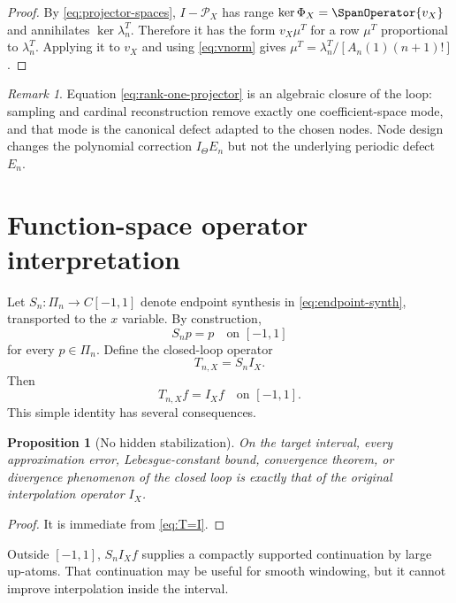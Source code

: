 \documentclass[11pt,oneside]{article}
\newtheorem{proposition}[theorem]{Proposition}
\theoremstyle{definition}
\theoremstyle{remark}
\newtheorem{remark}[theorem]{Remark}
\newcommand{\1}{\mathbf{1}}
\begin{document}
\begin{proof}
By \eqref{eq:projector-spaces}, $I-\mathcal P_X$ has range
$\ker\Phi_X=\SpanOperator\{v_X\}$ and annihilates $\ker\lambda_n^T$.  Therefore it
has the form $v_X\mu^T$ for a row $\mu^T$ proportional to $\lambda_n^T$.
Applying it to $v_X$ and using \eqref{eq:vnorm} gives
$\mu^T=\lambda_n^T/[A_n(1)(n+1)!]$.
\end{proof}

\begin{remark}
Equation \eqref{eq:rank-one-projector} is an algebraic closure of the loop:
sampling and cardinal reconstruction remove exactly one coefficient-space
mode, and that mode is the canonical defect adapted to the chosen nodes.
Node design changes the polynomial correction $I_\Theta E_n$ but not the
underlying periodic defect $E_n$.
\end{remark}

\section{Function-space operator interpretation}
\label{sec:operator}

Let $S_n:\Pi_n\to C[-1,1]$ denote endpoint synthesis in
\eqref{eq:endpoint-synth}, transported to the $x$ variable.  By construction,
\begin{equation}
 S_np=p\quad\text{on }[-1,1]
 \label{eq:Sidentity}
\end{equation}
for every $p\in\Pi_n$.  Define the closed-loop operator
\begin{equation}
 T_{n,X}=S_nI_X.
 \label{eq:T}
\end{equation}
Then
\begin{equation}
 T_{n,X}f=I_Xf\quad\text{on }[-1,1].
 \label{eq:T=I}
\end{equation}
This simple identity has several consequences.

\begin{proposition}[No hidden stabilization]
\label{prop:no-stabilization}
On the target interval, every approximation error, Lebesgue-constant bound,
convergence theorem, or divergence phenomenon of the closed loop is exactly
that of the original interpolation operator $I_X$.
\end{proposition}

\begin{proof}
It is immediate from \eqref{eq:T=I}.
\end{proof}

Outside $[-1,1]$, $S_nI_Xf$ supplies a compactly supported continuation by
large up-atoms.  That continuation may be useful for smooth windowing, but it
cannot improve interpolation inside the interval.
\end{document}
